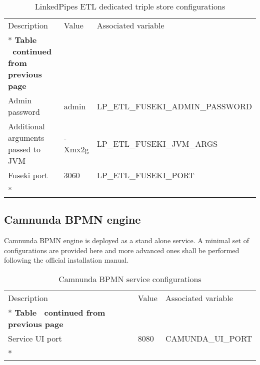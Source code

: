 	\begin{longtable}[c]{@{}p{4cm}p{2cm}l@{}}
		\toprule
		Description & Value & Associated variable \\* \midrule
		\endfirsthead
		\multicolumn{3}{c}%
		{{\bfseries Table \thetable\ continued from previous page}} \\
		\endhead
		\bottomrule
		\endfoot
		\endlastfoot
		Admin password & admin & LP\_ETL\_FUSEKI\_ADMIN\_PASSWORD \\
		Additional arguments passed to JVM & -Xmx2g & LP\_ETL\_FUSEKI\_JVM\_ARGS \\
		Fuseki port & 3060 & LP\_ETL\_FUSEKI\_PORT \\* \bottomrule
		\caption{LinkedPipes ETL dedicated triple store configurations}
		\label{tab:my-table6}\\
	\end{longtable}
	
	\subsection{Camnunda BPMN engine}

	Camnunda BPMN engine is deployed as a stand alone service.  A minimal set of configurations are provided here and more advanced ones shall be performed following the official installation manual. 
	
 	\begin{longtable}[c]{@{}p{4cm}p{2cm}l@{}}
	 	\toprule
	 	Description & Value & Associated variable \\* \midrule
	 	\endfirsthead
	 	\multicolumn{3}{c}%
	 	{{\bfseries Table \thetable\ continued from previous page}} \\
	 	\endhead
	 	\bottomrule
	 	\endfoot
	 	\endlastfoot
	 	Service UI port & 8080 & CAMUNDA\_UI\_PORT \\* \bottomrule
	 	\caption{Camnunda BPMN service configurations}
	 	\label{tab:my-table9}\\
	 \end{longtable}
	
	